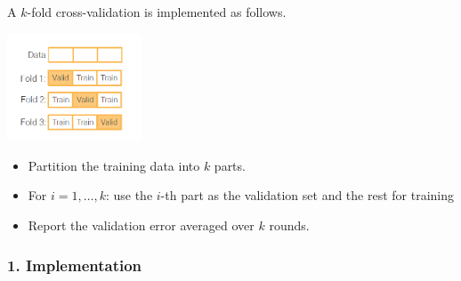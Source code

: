 \documentclass{article}
\begin{document}
A $k$-fold cross-validation is implemented as follows.

\begin{center}
    \includegraphics[width=4cm]{./figures/cv.png}
\end{center}


\begin{itemize}
    \item Partition the training data into $k$ parts.
    \item For $i=1, \dots, k$: use the $i$-th part as the validation set and the rest for training
    \item Report the validation error averaged over $k$ rounds.
    
\end{itemize}


\subsubsection*{1. Implementation}
\end{document}
